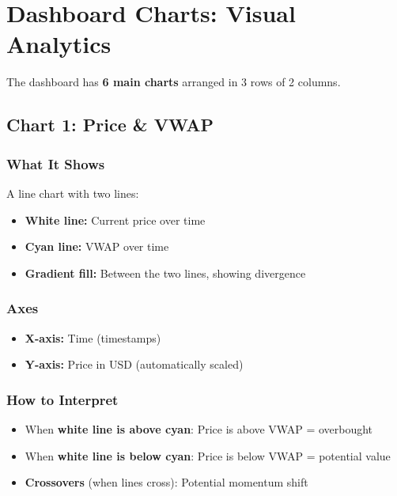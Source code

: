 \documentclass[12pt,a4paper]{article}
\begin{document}
\section{Dashboard Charts: Visual Analytics}

The dashboard has \textbf{6 main charts} arranged in 3 rows of 2 columns.

\subsection{Chart 1: Price \& VWAP}

\subsubsection{What It Shows}
A line chart with two lines:
\begin{itemize}
    \item \textbf{White line:} Current price over time
    \item \textbf{Cyan line:} VWAP over time
    \item \textbf{Gradient fill:} Between the two lines, showing divergence
\end{itemize}

\subsubsection{Axes}
\begin{itemize}
    \item \textbf{X-axis:} Time (timestamps)
    \item \textbf{Y-axis:} Price in USD (automatically scaled)
\end{itemize}

\subsubsection{How to Interpret}
\begin{itemize}
    \item When \textbf{white line is above cyan}: Price is above VWAP = overbought
    \item When \textbf{white line is below cyan}: Price is below VWAP = potential value
    \item \textbf{Crossovers} (when lines cross): Potential momentum shift
\end{itemize}
\end{document}
